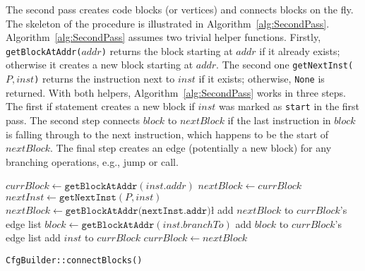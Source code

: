 The second pass creates code blocks (or vertices) and connects blocks on the fly.
The skeleton of the procedure is illustrated in Algorithm~\ref{alg:SecondPass}.
Algorithm~\ref{alg:SecondPass} assumes two trivial helper functions.
Firstly, \texttt{getBlockAtAddr($addr$)} returns the block starting at $addr$
if it already exists; otherwise it creates a new block starting at $addr$.
The second one \texttt{getNextInst($P, inst$)} returns the instruction next to $inst$ if it exists; otherwise, \texttt{None} is returned.
With both helpers, Algorithm~\ref{alg:SecondPass} works in three steps.
The first if statement creates a new block if $inst$ was marked as \texttt{start} in the first pass.
The second step connects $block$ to $nextBlock$ if the last instruction in $block$ is falling through to the next instruction, which happens to be the start of $nextBlock$.
The final step creates an edge (potentially a new block) for any branching operations, e.g., jump or call.


\begin{algorithm}[t]
    \DontPrintSemicolon
     {
         {
            $currBlock \gets \texttt{getBlockAtAddr}(inst.addr)$\;
        }
        $nextBlock \gets currBlock$\;
        $nextInst \gets \texttt{getNextInst}(P, inst)$\;
         {
             {
                $nextBlock \gets \texttt{getBlockAtAddr(nextInst.addr)}$\l\;
                add $nextBlock$ to $currBlock$'s edge list\;
            }
        }
         {
            $block \gets \texttt{getBlockAtAddr}(inst.branchTo)$\;
            add $block$ to $currBlock$'s edge list\;
        }
        add $inst$ to $currBlock$\;
        $currBlock \gets nextBlock$\;
    }
    \caption{\texttt{CfgBuilder::connectBlocks()}}
    \label{alg:SecondPass}
\end{algorithm}

